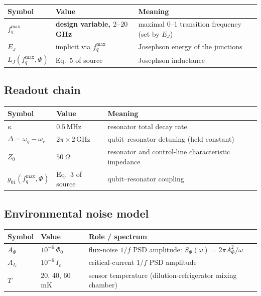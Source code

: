 \documentclass[11pt,a4paper]{article}
\newcommand{\Phizero}{\Phi_0}
\begin{document}
\begin{center}
\begin{tabular}{@{}lll@{}}
\toprule
Symbol & Value & Meaning \\
\midrule
$f_q^{\max}$ & \textbf{design variable, $2$--$20\,$GHz} & maximal $0$--$1$ transition frequency (set by $E_J$) \\
$E_J$ & implicit via $f_q^{\max}$ & Josephson energy of the junctions \\
$L_J(f_q^{\max},\Phi)$ & Eq.~5 of source & Josephson inductance \\
\bottomrule
\end{tabular}
\end{center}

\subsection{Readout chain}

\begin{center}
\begin{tabular}{@{}lll@{}}
\toprule
Symbol & Value & Meaning \\
\midrule
$\kappa$ & $0.5\,$MHz & resonator total decay rate \\
$\Delta = \omega_q - \omega_r$ & $2\pi\times 2\,$GHz & qubit--resonator detuning (held constant) \\
$Z_0$ & $50\,\Omega$ & resonator and control-line characteristic impedance \\
$g_{01}(f_q^{\max},\Phi)$ & Eq.~3 of source & qubit--resonator coupling \\
\bottomrule
\end{tabular}
\end{center}

\subsection{Environmental noise model}

\begin{center}
\begin{tabular}{@{}lll@{}}
\toprule
Symbol & Value & Role / spectrum \\
\midrule
$A_\Phi$ & $10^{-6}\,\Phizero$ & flux-noise $1/f$ PSD amplitude: $S_\Phi(\omega) = 2\pi A_\Phi^2/\omega$ \\
$A_{I_c}$ & $10^{-6}\,I_c$ & critical-current $1/f$ PSD amplitude \\
$T$ & $20,\,40,\,60\,$mK & sensor temperature (dilution-refrigerator mixing chamber) \\
\bottomrule
\end{tabular}
\end{center}
\end{document}
